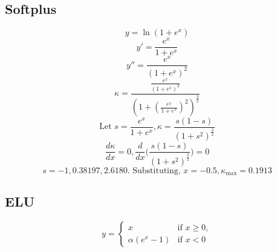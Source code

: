 \documentclass[manuscript, screen, review]{jair}
\begin{document}
\subsection{Softplus}\label{app:softplus}

\begin{displaymath}
  y = \ln{({1 + e^{x}})}
\end{displaymath}
\begin{displaymath}
  y' = \frac{e^x}{1 + e^x}
\end{displaymath}
\begin{displaymath}
  y'' = \frac{e^{x}}{(1 + e^{x})^2}
\end{displaymath}
\begin{displaymath}
  \kappa = \frac{\frac{e^{x}}{(1 + e^{x})^2}}{(1 + (\frac{e^x}{1 + e^x})^2)^\frac{3}{2}}
\end{displaymath}
\begin{displaymath}
  \text{Let }s = \frac{e^x}{1 + e^x}, \kappa = \frac{s(1 - s)}{(1 + s^2)^\frac{3}{2}}
\end{displaymath}
\begin{displaymath}
  \frac{d\kappa}{dx} = 0, \frac{d}{dx}\bigg(\frac{s(1 - s)}{(1 + s^2)^\frac{3}{2}}\bigg) = 0
\end{displaymath}
\begin{displaymath}
  s = -1, 0.38197, 2.6180 \text{. Substituting, }x = -0.5, \kappa_{\text{max}} = 0.1913
\end{displaymath}

\subsection{ELU}\label{app:elu}
 \begin{displaymath}
  y = \begin{cases}
  x & \text{if } x \geq 0, \\
  \alpha (e^x - 1) & \text{if } x < 0
\end{cases}
 \end{displaymath}
\end{document}
